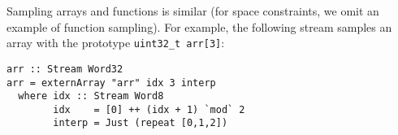 %
%

Sampling arrays and functions is similar (for space constraints, we omit an
example of function sampling).  For example, the following stream samples an
array with the prototype {\tt uint32\_t arr[3]}:
%
\begin{lstlisting}[frame=single]
arr :: Stream Word32
arr = externArray "arr" idx 3 interp
  where idx :: Stream Word8
        idx    = [0] ++ (idx + 1) `mod` 2
        interp = Just (repeat [0,1,2])
\end{lstlisting}

%
%


